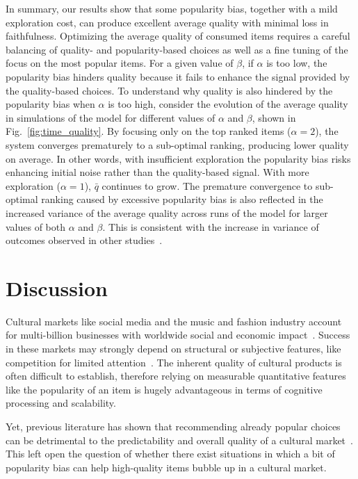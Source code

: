 In summary, our results show that some popularity bias, together with a mild exploration cost, can produce excellent average quality with minimal loss in faithfulness. Optimizing the average quality of consumed items requires a careful balancing of quality- and popularity-based choices as well as a fine tuning of the focus on the most popular items. For a given value of $\beta$, if $\alpha$ is too low, the popularity bias hinders quality because it fails to enhance the signal provided by the quality-based choices. To understand why quality is also hindered by the popularity bias when $\alpha$ is too high, consider the evolution of the average quality in simulations of the model for different values of $\alpha$ and $\beta$, shown in Fig.~\ref{fig:time_quality}. 
By focusing only on the top ranked items ($\alpha=2$), the system converges prematurely to a sub-optimal ranking, producing lower quality on average. In other words, with insufficient exploration the popularity bias risks enhancing initial noise rather than the quality-based signal. 
With more exploration ($\alpha=1$), $\bar{q}$ continues to grow. %
The premature convergence to sub-optimal ranking caused by excessive popularity bias is also reflected in the increased variance of the average quality across runs of the model for larger values of both $\alpha$ and $\beta$. This is consistent with the increase in variance of outcomes observed in other studies~\cite{salganik2006experimental,hogg2015disentangling}.

\section*{Discussion}

Cultural markets like social media and the music and fashion industry account for multi-billion businesses with worldwide social and economic impact~\cite{Park:2016:SAI:2818048.2820065}.  Success in these markets may strongly depend on structural or subjective features, like competition for limited attention~\cite{Weng2012,QiuNHB17}. The inherent quality of cultural products is often difficult to establish, therefore relying on measurable quantitative features like the popularity of an item is hugely advantageous in terms of cognitive processing and scalability. 

Yet, previous literature has shown that recommending already popular choices can be detrimental to the predictability and overall quality of a cultural  market~\cite{salganik2006experimental}. This left open the question of whether there exist situations in which a bit of popularity bias can help high-quality items bubble up in a cultural market. 

